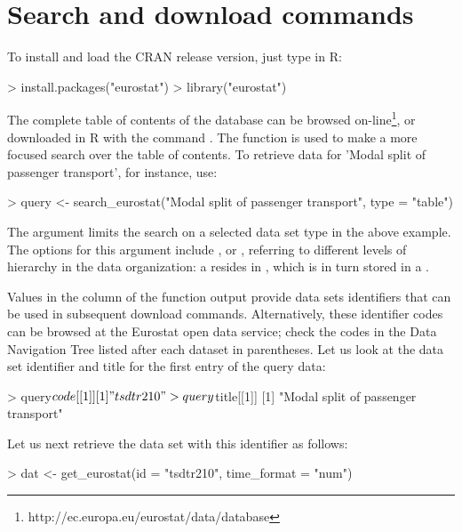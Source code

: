 \section{Search and download commands}

To install and load the CRAN release version, just type in R:

\begin{example}
> install.packages("eurostat")
> library("eurostat")
\end{example}

The complete table of contents of the database can be browsed
on-line\footnote{http://ec.europa.eu/eurostat/data/database}, or
downloaded in R with the command . The function  is used
to make a more focused search over the table of contents. To retrieve
data for 'Modal split of passenger transport', for instance, use:

\begin{example}
> query <- search_eurostat("Modal split of passenger transport", type = "table")
\end{example}

The  argument limits the search on a selected data set type
in the above example. The options for this argument
include ,  or , referring to
different levels of hierarchy in the data organization: a 
resides in , which is in turn stored in a
.

Values in the  column of the 
function output provide data sets identifiers that can be used in
subsequent download commands. Alternatively, these identifier codes
can be browsed at the Eurostat open data service; check the codes in
the Data Navigation Tree listed after each dataset in parentheses. Let
us look at the data set identifier and title for the first entry of
the query data:

\begin{example}
> query$code[[1]]
[1] "tsdtr210"

> query$title[[1]]
[1] "Modal split of passenger transport"
\end{example}


Let us next retrieve the data set with this identifier as follows:

\begin{example}
> dat <- get_eurostat(id = "tsdtr210", time_format = "num")
\end{example}

